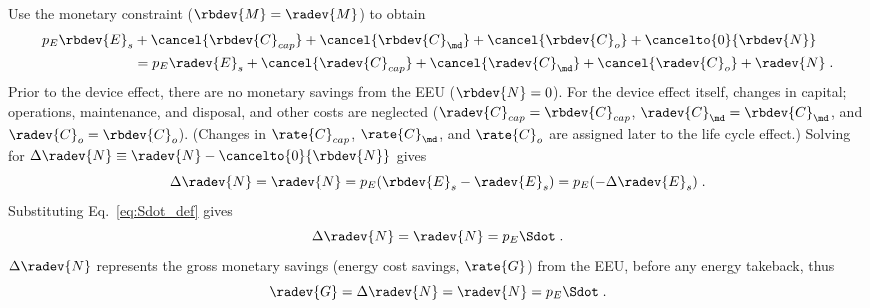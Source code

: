 \begin{landscape}
{Use the monetary constraint ($\rbdev{M} = \radev{M}$) to obtain
%
\begin{align}
  p_E \rbdev{E}_s &+ \cancel{\rbdev{C}_{cap}} + \cancel{\rbdev{C}_{\md}} + \cancel{\rbdev{C}_o} + \cancelto{0}{\rbdev{N}} \nonumber \\
                  &= p_E \radev{E}_s + \cancel{\radev{C}_{cap}} + \cancel{\radev{C}_{\md}} + \cancel{\radev{C}_o}  + \radev{N} \; .
\end{align}
%
Prior to the device effect, there are no monetary savings from the EEU ($\rbdev{N} = 0$).
For the device effect itself, 
changes in capital; operations, maintenance, and disposal, and other costs are neglected
($\radev{C}_{cap} = \rbdev{C}_{cap}$, $\radev{C}_{\md} = \rbdev{C}_{\md}$, and $\radev{C}_o = \rbdev{C}_o$).
(Changes in $\rate{C}_{cap}$, $\rate{C}_{\md}$, and $\rate{C}_o$ 
are assigned later to the life cycle effect.)
Solving for $\Delta \radev{N} \equiv \radev{N} - \cancelto{0}{\rbdev{N}}$ gives 
%
\begin{equation}
  \Delta \radev{N} = \radev{N} = p_E(\rbdev{E}_s - \radev{E}_s) = p_E (-\Delta \radev{E}_s) \; .
\end{equation}
%
Substituting Eq.~\ref{eq:Sdot_def} gives
%
\begin{equation}
  \Delta \radev{N} = \radev{N} = p_E \Sdot \; .
\end{equation}
%
$\Delta \radev{N}$ represents the gross monetary savings (energy cost savings, $\rate{G}$) from the EEU, 
before any energy takeback, thus
%
\begin{equation}
  \radev{G} = \Delta \radev{N} = \radev{N} = p_E \Sdot \; .
\end{equation}
}

\end{landscape}
